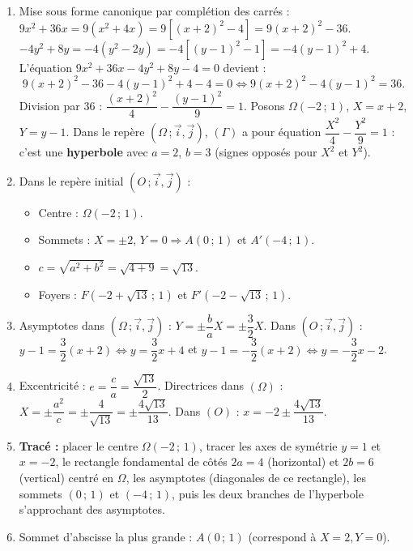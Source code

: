 \documentclass[11pt]{article}
\begin{document}
\begin{corrige}
\begin{enumerate}
\item Mise sous forme canonique par complétion des carrés :
  $9x^{2} + 36x = 9(x^{2} + 4x) = 9[(x+2)^{2} - 4] = 9(x+2)^{2} - 36$.
  $-4y^{2} + 8y = -4(y^{2} - 2y) = -4[(y-1)^{2} - 1] = -4(y-1)^{2} + 4$.
  L'équation $9x^{2} + 36x - 4y^{2} + 8y - 4 = 0$ devient :
  \[ 9(x+2)^{2} - 36 - 4(y-1)^{2} + 4 - 4 = 0 \iff 9(x+2)^{2} - 4(y-1)^{2} = 36. \]
  Division par $36$ : $\dfrac{(x+2)^{2}}{4} - \dfrac{(y-1)^{2}}{9} = 1$.
  Posons $\Omega(-2\,;\,1)$, $X = x + 2$, $Y = y - 1$. Dans le repère $(\Omega\,;\vec{i},\vec{j})$, $(\Gamma)$ a pour équation $\dfrac{X^{2}}{4} - \dfrac{Y^{2}}{9} = 1$ : c'est une \textbf{hyperbole} avec $a = 2$, $b = 3$ (signes opposés pour $X^{2}$ et $Y^{2}$).
\item Dans le repère initial $(O\,;\vec{i},\vec{j})$ :
  \begin{itemize}
    \item Centre : $\Omega(-2\,;\,1)$.
    \item Sommets : $X = \pm 2$, $Y = 0 \Rightarrow A(0\,;\,1)$ et $A'(-4\,;\,1)$.
    \item $c = \sqrt{a^{2}+b^{2}} = \sqrt{4+9} = \sqrt{13}$.
    \item Foyers : $F(-2 + \sqrt{13}\,;\,1)$ et $F'(-2 - \sqrt{13}\,;\,1)$.
  \end{itemize}
\item Asymptotes dans $(\Omega\,;\vec{i},\vec{j})$ : $Y = \pm \dfrac{b}{a}X = \pm \dfrac{3}{2}X$.
  Dans $(O\,;\vec{i},\vec{j})$ : $y - 1 = \dfrac{3}{2}(x+2) \iff y = \dfrac{3}{2}x + 4$ et $y - 1 = -\dfrac{3}{2}(x+2) \iff y = -\dfrac{3}{2}x - 2$.
\item Excentricité : $e = \dfrac{c}{a} = \dfrac{\sqrt{13}}{2}$.
  Directrices dans $(\Omega)$ : $X = \pm \dfrac{a^{2}}{c} = \pm \dfrac{4}{\sqrt{13}} = \pm \dfrac{4\sqrt{13}}{13}$.
  Dans $(O)$ : $x = -2 \pm \dfrac{4\sqrt{13}}{13}$.
\item \textbf{Tracé :} placer le centre $\Omega(-2\,;\,1)$, tracer les axes de symétrie $y = 1$ et $x = -2$, le rectangle fondamental de côtés $2a = 4$ (horizontal) et $2b = 6$ (vertical) centré en $\Omega$, les asymptotes (diagonales de ce rectangle), les sommets $(0\,;\,1)$ et $(-4\,;\,1)$, puis les deux branches de l'hyperbole s'approchant des asymptotes.
\item Sommet d'abscisse la plus grande : $A(0\,;\,1)$ (correspond à $X=2, Y=0$).

\end{enumerate}
\end{corrige}
\end{document}
